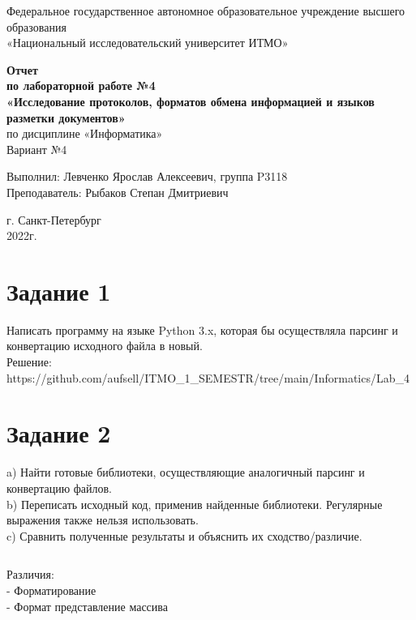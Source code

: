 \documentclass[12pt,onecolumn]{article}
\begin{document}
\begin{center}
    Федеральное государственное автономное образовательное учреждение высшего образования\\
	«Национальный исследовательский университет ИТМО»
\end{center}
\vspace{1cm}
\setcounter{page}{0} 
\begin{center}
    \large \textbf{Отчет}\\
    \textbf{по лабораторной работе №4}\\
    \large \textbf{«Исследование протоколов, форматов обмена информацией и языков разметки документов»}\\
     по дисциплине «Информатика»\\
	\vspace{1cm}
    Вариант №4\\
\end{center}

\vspace{10cm}
\begin{flushright}
  Выполнил: Левченко Ярослав Алексеевич, группа P3118\\
  Преподаватель: Рыбаков Степан Дмитриевич\\
\end{flushright}

\vspace{5cm}
\begin{center}
    г. Санкт-Петербург\\
    2022г.
\end{center}
\thispagestyle{empty}
\newpage
\tableofcontents
\newpage
\section{Задание 1}
Написать программу на языке Python 3.x, которая бы осуществляла парсинг и конвертацию исходного файла в новый. \\
Решение: \\
https://github.com/aufsell/ITMO\_1\_SEMESTR/tree/main/Informatics/Lab\_4
\newpage
\section{Задание 2}
a) Найти готовые библиотеки, осуществляющие аналогичный парсинг и конвертацию файлов. \\
b) Переписать исходный код, применив найденные библиотеки. Регулярные выражения также нельзя использовать. \\
c) Сравнить полученные результаты и объяснить их сходство/различие. \\
\inputminted{python}{trash/1}
Различия:\\
- Форматирование \\
- Формат представление массива \\
\newpage
\end{document}
